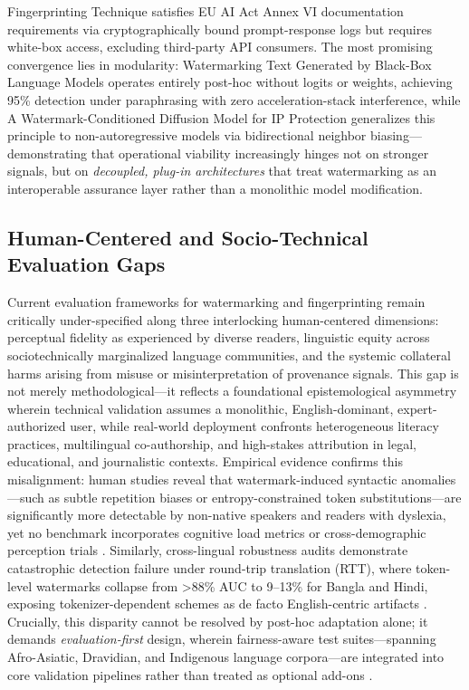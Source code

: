 \documentclass[11pt,a4paper]{article}
\begin{document}
Fingerprinting Technique \cite{arxiv:2407.10887} satisfies EU AI Act Annex VI documentation requirements via cryptographically bound prompt-response logs but requires white-box access, excluding third-party API consumers. The most promising convergence lies in modularity: Watermarking Text Generated by Black-Box Language Models \cite{arxiv:2305.08883} operates entirely post-hoc without logits or weights, achieving 95\% detection under paraphrasing with zero acceleration-stack interference, while A Watermark-Conditioned Diffusion Model for IP Protection \cite{arxiv:2403.10893} generalizes this principle to non-autoregressive models via bidirectional neighbor biasing---demonstrating that operational viability increasingly hinges not on stronger signals, but on \emph{decoupled, plug-in architectures} that treat watermarking as an interoperable assurance layer rather than a monolithic model modification.


\subsection{Human-Centered and Socio-Technical Evaluation Gaps}


Current evaluation frameworks for watermarking and fingerprinting remain critically under-specified along three interlocking human-centered dimensions: perceptual fidelity as experienced by diverse readers, linguistic equity across sociotechnically marginalized language communities, and the systemic collateral harms arising from misuse or misinterpretation of provenance signals. This gap is not merely methodological---it reflects a foundational epistemological asymmetry wherein technical validation assumes a monolithic, English-dominant, expert-authorized user, while real-world deployment confronts heterogeneous literacy practices, multilingual co-authorship, and high-stakes attribution in legal, educational, and journalistic contexts. Empirical evidence confirms this misalignment: human studies reveal that watermark-induced syntactic anomalies---such as subtle repetition biases or entropy-constrained token substitutions---are significantly more detectable by non-native speakers and readers with dyslexia, yet no benchmark incorporates cognitive load metrics or cross-demographic perception trials \cite{arxiv:2403.04808}. Similarly, cross-lingual robustness audits demonstrate catastrophic detection failure under round-trip translation (RTT), where token-level watermarks collapse from >88\% AUC to 9--13\% for Bangla and Hindi, exposing tokenizer-dependent schemes as de facto English-centric artifacts \cite{arxiv:2402.14007}. Crucially, this disparity cannot be resolved by post-hoc adaptation alone; it demands \emph{evaluation-first} design, wherein fairness-aware test suites---spanning Afro-Asiatic, Dravidian, and Indigenous language corpora---are integrated into core validation pipelines rather than treated as optional add-ons \cite{arxiv:2305.08883}.
\end{document}
